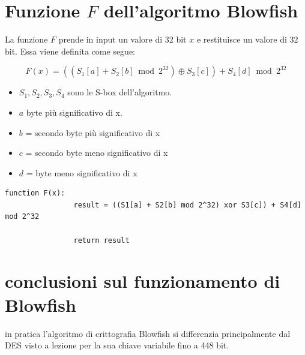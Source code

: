 \documentclass[a4paper,12pt]{report}
\begin{document}
		\section*{Funzione $F$ dell'algoritmo Blowfish}

		La funzione $F$ prende in input un valore di 32 bit $x$ e restituisce un valore
		di 32 bit. Essa viene definita come segue:

		\[
			F(x) = ((S_1[a] + S_2[b] \bmod 2^{32}) \oplus S_3[c]) + S_4[d] \bmod 2^{32}
		\]
		\begin{itemize}
			\item $S_1, S_2, S_3, S_4$ sono le S-box dell'algoritmo.
			\item $a$ byte più significativo di x.
			\item $b$ = secondo byte più significativo di x
			\item $c$ = secondo byte meno significativo di x
			\item $d$ = byte meno significativo di x
			
		\end{itemize}
		
		\begin{lstlisting}[style=pseudocode]
			function F(x):
				result = ((S1[a] + S2[b] mod 2^32) xor S3[c]) + S4[d] mod 2^32
				
				return result
		\end{lstlisting}
		\section*{conclusioni sul funzionamento di Blowfish}
		in pratica l'algoritmo di crittografia Blowfish si differenzia
		principalmente dal DES visto a lezione per la sua chiave variabile fino a
		448 bit. \cite{blfh-lenth-key}
\end{document}
